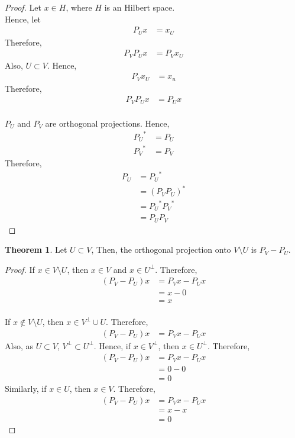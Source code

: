 \documentclass[titlepage, fleqn, a4paper, 12pt, twoside]{article}
\theoremstyle{definition}
\theoremstyle{theorem}
\newtheorem{theorem}{Theorem}
\begin{document}
\begin{proof}
	Let $x \in H$, where $H$ is an Hilbert space.\\
	Hence, let
	\begin{align*}
		P_U x &= x_U
	\end{align*}
	Therefore,
	\begin{align*}
		P_V P_U x &= P_V x_U
	\end{align*}
	Also, $U \subset V$.
	Hence,
	\begin{align*}
		P_V x_U &= x_u
	\end{align*}
	Therefore,
	\begin{align*}
		P_V P_U x &= P_U x
	\end{align*}
	~\\
	$P_U$ and $P_V$ are orthogonal projections.
	Hence,
	\begin{align*}
		{P_U}^* &= P_U\\
		{P_V}^* &= P_V
	\end{align*}
	Therefore,
	\begin{align*}
		P_U &= {P_U}^*\\
		&= (P_V P_U)^*\\
		&= {P_U}^* {P_V}^*\\
		&= P_U P_V
	\end{align*}
\end{proof}

\begin{theorem}
	Let $U \subset V$,
	Then, the orthogonal projection onto $V \setminus U$ is $P_V - P_U$.
\end{theorem}

\begin{proof}
	If $x \in V \setminus U$, then $x \in V$ and $x \in U^{\perp}$.
	Therefore,
	\begin{align*}
		(P_V - P_U) x &= P_V x - P_U x\\
		&= x - 0\\
		&= x
	\end{align*}
	~\\
	If $x \notin V \setminus U$, then $x \in V^{\perp} \cup U$.
	Therefore,
	\begin{align*}
		(P_V - P_U) x &= P_V x - P_U x
	\end{align*}
	Also, as $U \subset V$, $V^{\perp} \subset U^{\perp}$.
	Hence, if $x \in V^{\perp}$, then $x \in U^{\perp}$.
	Therefore,
	\begin{align*}
		(P_V - P_U) x &= P_V x - P_U x\\
		&= 0 - 0\\
		&= 0
	\end{align*}
	Similarly, if $x \in U$, then $x \in V$.
	Therefore,
	\begin{align*}
		(P_V - P_U) x &= P_V x - P_U x\\
		&= x - x\\
		&= 0
	\end{align*}
\end{proof}
\end{document}
